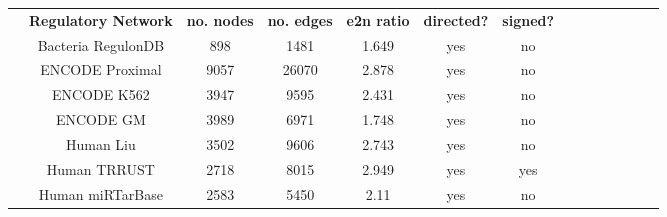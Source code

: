\documentclass[12pt]{article}	%
\newcommand{\myPadTop}{6.5pt}
\newcommand{\myPadBottom}{4pt}
\begin{document}
    \begin{table}[H]%
        \centering
        \setlength\arrayrulewidth{.1pt}%
        \scriptsize
            \setlength\cellspacetoplimit{\myPadTop}\setlength\cellspacebottomlimit{\myPadBottom}
            \begin{tabular}{@{}Sc Sc|Sc|Sc|Sc|Sc|Sc@{}}
                    & \textbf{\normalsize Regulatory Network} & \textbf{\normalsize no. nodes} & \textbf{\normalsize no. edges}	& \textbf{\normalsize e2n ratio} & \textbf{\normalsize directed? } & \textbf{\normalsize signed? }%
                            \\[.05cm] 
                                    & Bacteria RegulonDB  \cite{gama-castro_regulondb_2016} & 898       & 1481      & 1.649    & yes & no %
                            \\[.05cm] 
                                    &  ENCODE Proximal  \cite{gerstein_architecture_2012}   & 9057      & 26070     & 2.878    & yes & no %
                            \\[.05cm] 
                                    &  ENCODE K562  \cite{gerstein_architecture_2012}       & 3947      & 9595      & 2.431    & yes & no %
                            \\[.05cm] 
                                    &  ENCODE GM  \cite{gerstein_architecture_2012}         & 3989      & 6971      & 1.748    & yes & no %
                            \\[.05cm] 
                                    & Human Liu  \cite{liu_regnetwork:_2015}                & 3502      & 9606      & 2.743    & yes & no %
                            \\[.05cm] 
                                    & Human TRRUST  \cite{han_trrust:_2015}                 & 2718      & 8015      & 2.949    & yes & yes %
                            \\[.05cm] 
                                    & Human miRTarBase  \cite{chou_mirtarbase_2016}         & 2583      & 5450      & 2.11     & yes & no %
                            \\[.05cm] 

\end{tabular}
\end{table}
\end{document}
